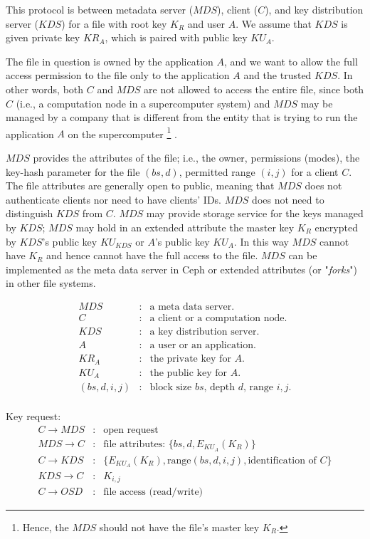 \documentclass[11pt]{article}
\newcommand{\mds}{\ensuremath{\mathit{MDS}}}
\newcommand{\kds}{\ensuremath{\mathit{KDS}}}
\begin{document}
This protocol is between metadata server ($\mds$), client ($C$), and
key distribution server ($\kds$) for a file with root key $K_R$ and
user $A$.  We assume that $\kds$ is given private key
$\textit{KR}_A$, which is paired with public key $\textit{KU}_A$.

\vspace{1ex}

The file in question is owned by the application $A$, and we want
to allow the full access permission to the file only to the
application $A$ and the trusted $\kds$.
In other words, both $C$ and $\mds$ are not
allowed to access the entire file, since both $C$ (i.e., a computation
node in a supercomputer system) and $\mds$ may be managed by a
company that is different from the entity that is trying to run
the application $A$ on the supercomputer%
\footnote{Hence, the $\mds$ should not have the file's master key $K_R$.}%
.

$\mds$ provides the attributes of the file; i.e., the owner, permissions
(modes), the key-hash parameter for the file $(bs,d)$,
permitted range $(i,j)$ for a client $C$.
The file attributes are generally open to public, meaning that $\mds$
does not authenticate clients nor need to have clients' IDs.
$\mds$ does not need to distinguish $\kds$ from $C$.
$\mds$ may provide storage service for the keys managed by $\kds$;
$\mds$ may hold in an extended attribute the master key $K_R$
encrypted by $\kds$'s public key $KU_{\kds}$ or $A$'s public key $KU_{A}$.
In this way $\mds$ cannot have $K_R$ and hence cannot have
the full access to the file.
$\mds$ can be implemented as the meta data server in Ceph
or extended attributes (or "\textit{forks}") in other file systems.

\begin{eqnarray*}
   \mds & : & \mbox{a meta data server.} \\
   C    & : & \mbox{a client or a computation node.} \\
   \kds & : & \mbox{a key distribution server.} \\
   A    & : & \mbox{a user or an application.} \\
   \textit{KR}_A & : & \mbox{the private key for $A$.} \\
   \textit{KU}_A & : & \mbox{the public key for $A$.} \\
   (bs,d,i,j) & : & \mbox{block size $bs$, depth $d$, range $i,j$.} \\
\end{eqnarray*}

Key request:
\begin{eqnarray}
  C \rightarrow \mds & : & \mbox{open request} \\
  \mds \rightarrow C & : & \mbox{file attributes: } \{bs,d,E_{KU_A}(K_R)\} \\
  C \rightarrow \kds & : &
    \{ E_{KU_A} (K_R), \mbox{range}(bs,d,i,j),
       \mbox{identification of $C$} \} \\
  \kds \rightarrow C & : & K_{i,j} \\
  C \rightarrow OSD & : & \mbox{file access (read/write)}
\end{eqnarray}
\end{document}
